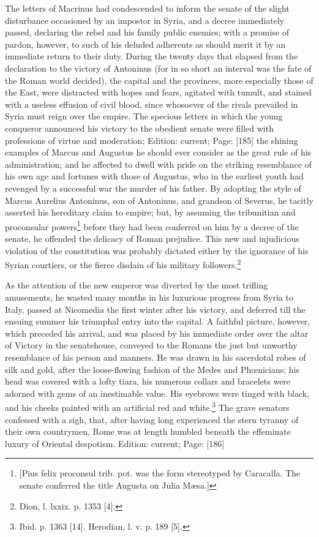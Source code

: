 The letters of Macrinus had condescended to inform the senate of the slight disturbance occasioned by an impostor in Syria, and a decree immediately passed, declaring the rebel and his family public enemies; with a promise of pardon, however, to such of his deluded adherents as should merit it by an immediate return to their duty. During the twenty days that elapsed from the declaration to the victory of Antoninus (for in so short an interval was the fate of the Roman world decided), the capital and the provinces, more especially those of the East, were distracted with hopes and fears, agitated with tumult, and stained with a useless effusion of civil blood, since whosoever of the rivals prevailed in Syria must reign over the empire. The specious letters in which the young conqueror announced his victory to the obedient senate were filled with professions of virtue and moderation; Edition: current; Page: [185] the shining examples of Marcus and Augustus he should ever consider as the great rule of his administration; and he affected to dwell with pride on the striking resemblance of his own age and fortunes with those of Augustus, who in the earliest youth had revenged by a successful war the murder of his father. By adopting the style of Marcus Aurelius Antoninus, son of Antoninus, and grandson of Severus, he tacitly asserted his hereditary claim to empire; but, by assuming the tribunitian and proconsular powers\footnote{[Pius felix proconsul trib. pot. was the form stereotyped by Caracalla. The senate conferred the title Augusta on Julia Mæsa.]} before they had been conferred on him by a decree of the senate, he offended the delicacy of Roman prejudice. This new and injudicious violation of the constitution was probably dictated either by the ignorance of his Syrian courtiers, or the fierce disdain of his military followers.\footnote{Dion, l. lxxix. p. 1353 [4].}

As the attention of the new emperor was diverted by the most trifling amusements, he wasted many months in his luxurious progress from Syria to Italy, passed at Nicomedia the first winter after his victory, and deferred till the ensuing summer his triumphal entry into the capital. A faithful picture, however, which preceded his arrival, and was placed by his immediate order over the altar of Victory in the senatehouse, conveyed to the Romans the just but unworthy resemblance of his person and manners. He was drawn in his sacerdotal robes of silk and gold, after the loose-flowing fashion of the Medes and Phœnicians; his head was covered with a lofty tiara, his numerous collars and bracelets were adorned with gems of an inestimable value. His eyebrows were tinged with black, and his cheeks painted with an artificial red and white.\footnote{Ibid. p. 1363 [14]. Herodian, l. v. p. 189 [5].} The grave senators confessed with a sigh, that, after having long experienced the stern tyranny of their own countrymen, Rome was at length humbled beneath the effeminate luxury of Oriental despotism.
Edition: current; Page: [186]

